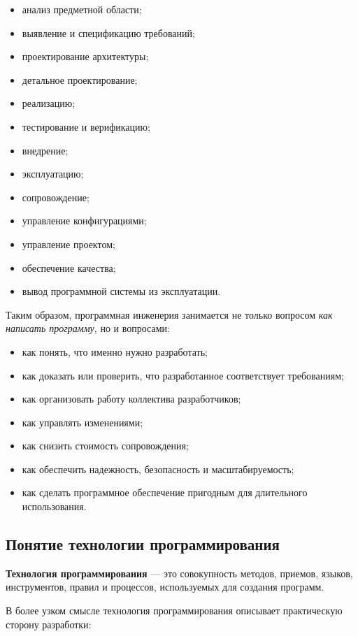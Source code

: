 \documentclass[12pt,a4paper]{article}
\begin{document}
\begin{itemize}
    \item анализ предметной области;
    \item выявление и спецификацию требований;
    \item проектирование архитектуры;
    \item детальное проектирование;
    \item реализацию;
    \item тестирование и верификацию;
    \item внедрение;
    \item эксплуатацию;
    \item сопровождение;
    \item управление конфигурациями;
    \item управление проектом;
    \item обеспечение качества;
    \item вывод программной системы из эксплуатации.
\end{itemize}

Таким образом, программная инженерия занимается не только вопросом \emph{как написать программу}, но и вопросами:

\begin{itemize}
    \item как понять, что именно нужно разработать;
    \item как доказать или проверить, что разработанное соответствует требованиям;
    \item как организовать работу коллектива разработчиков;
    \item как управлять изменениями;
    \item как снизить стоимость сопровождения;
    \item как обеспечить надежность, безопасность и масштабируемость;
    \item как сделать программное обеспечение пригодным для длительного использования.
\end{itemize}

\subsection{Понятие технологии программирования}

\textbf{Технология программирования} --- это совокупность методов, приемов, языков, инструментов, правил и процессов, используемых для создания программ.

В более узком смысле технология программирования описывает практическую сторону разработки:
\end{document}
